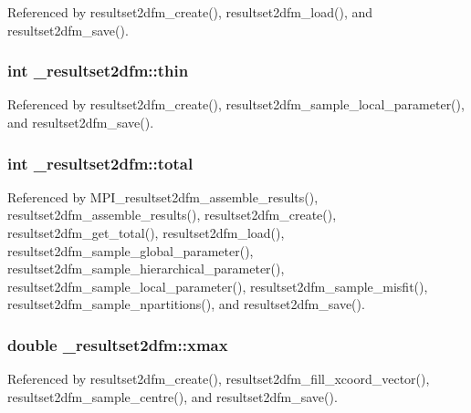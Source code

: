 Referenced by resultset2dfm\+\_\+create(), resultset2dfm\+\_\+load(), and resultset2dfm\+\_\+save().

\subsubsection[{\texorpdfstring{thin}{thin}}]{\setlength{\rightskip}{0pt plus 5cm}int \+\_\+resultset2dfm\+::thin}\hypertarget{struct__resultset2dfm_a862ef0a2c5de1e5343bdba2199ed766c}{}\label{struct__resultset2dfm_a862ef0a2c5de1e5343bdba2199ed766c}


Referenced by resultset2dfm\+\_\+create(), resultset2dfm\+\_\+sample\+\_\+local\+\_\+parameter(), and resultset2dfm\+\_\+save().

\subsubsection[{\texorpdfstring{total}{total}}]{\setlength{\rightskip}{0pt plus 5cm}int \+\_\+resultset2dfm\+::total}\hypertarget{struct__resultset2dfm_a152dc4e7eddb757b55fd65fe646e1016}{}\label{struct__resultset2dfm_a152dc4e7eddb757b55fd65fe646e1016}


Referenced by M\+P\+I\+\_\+resultset2dfm\+\_\+assemble\+\_\+results(), resultset2dfm\+\_\+assemble\+\_\+results(), resultset2dfm\+\_\+create(), resultset2dfm\+\_\+get\+\_\+total(), resultset2dfm\+\_\+load(), resultset2dfm\+\_\+sample\+\_\+global\+\_\+parameter(), resultset2dfm\+\_\+sample\+\_\+hierarchical\+\_\+parameter(), resultset2dfm\+\_\+sample\+\_\+local\+\_\+parameter(), resultset2dfm\+\_\+sample\+\_\+misfit(), resultset2dfm\+\_\+sample\+\_\+npartitions(), and resultset2dfm\+\_\+save().

\subsubsection[{\texorpdfstring{xmax}{xmax}}]{\setlength{\rightskip}{0pt plus 5cm}double \+\_\+resultset2dfm\+::xmax}\hypertarget{struct__resultset2dfm_aa9a21977e9a138037c458dd3ba12320d}{}\label{struct__resultset2dfm_aa9a21977e9a138037c458dd3ba12320d}


Referenced by resultset2dfm\+\_\+create(), resultset2dfm\+\_\+fill\+\_\+xcoord\+\_\+vector(), resultset2dfm\+\_\+sample\+\_\+centre(), and resultset2dfm\+\_\+save().

